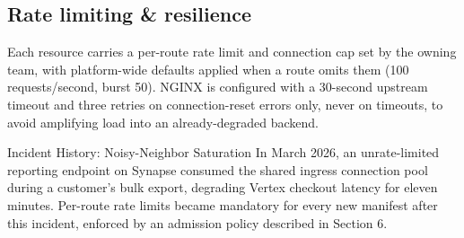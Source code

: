 \subsection{Rate limiting \& resilience}
Each  resource carries a per-route rate limit and connection cap set by the owning team, with platform-wide defaults applied when a route omits them (100 requests/second, burst 50). NGINX is configured with a 30-second upstream timeout and three retries on connection-reset errors only, never on timeouts, to avoid amplifying load into an already-degraded backend.

\begin{warningbox}{Incident History: Noisy-Neighbor Saturation}
In March 2026, an unrate-limited reporting endpoint on Synapse consumed the shared ingress connection pool during a customer's bulk export, degrading Vertex checkout latency for eleven minutes. Per-route rate limits became mandatory for every new  manifest after this incident, enforced by an admission policy described in Section 6.
\end{warningbox}
